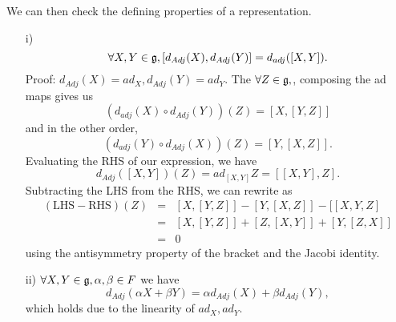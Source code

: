 We can then check the defining properties of a representation.
\begin{enumerate}
    \item[i)] $$\forall X, Y\in \mathfrak{g}, [d_{Adj}(X),d_{Adj}(Y)]=d_{adj}([X,Y]).$$
    Proof: $d_{Adj}(X)=ad_X,d_{Adj}(Y)=ad_Y.$
    The $\forall Z\in \mathfrak{g},$, composing the ad maps gives us
    $$(d_{adj}(X) \circ d_{Adj}(Y))(Z)=[X,[Y,Z]]$$
    and in the other order,
    $$(d_{adj}(Y) \circ d_{Adj}(X))(Z)=[Y,[X,Z]].$$
    Evaluating the RHS of our expression, we have
    $$d_{Adj}([X,Y])(Z)=ad_{[X,Y]}Z=[[X,Y],Z].$$
    Subtracting the LHS from the RHS, we can rewrite as
    \begin{eqnarray*}
    (\text{LHS}-\text{RHS})(Z)&=&[X,[Y,Z]]-[Y,[X,Z]]-[[X,Y,Z]\\
    &=&[X,[Y,Z]]+[Z,[X,Y]]+[Y,[Z,X]]\\
    &=&0
    \end{eqnarray*}
    using the antisymmetry property of the bracket and the Jacobi identity.
    \item[ii)] $\forall X,Y\in \mathfrak{g}, \alpha,\beta\in F$ we have
    $$d_{Adj}(\alpha X+\beta Y)=\alpha d_{Adj}(X)+\beta d_{Adj}(Y),$$
    which holds due to the linearity of $ad_X, ad_Y.$
\end{enumerate}